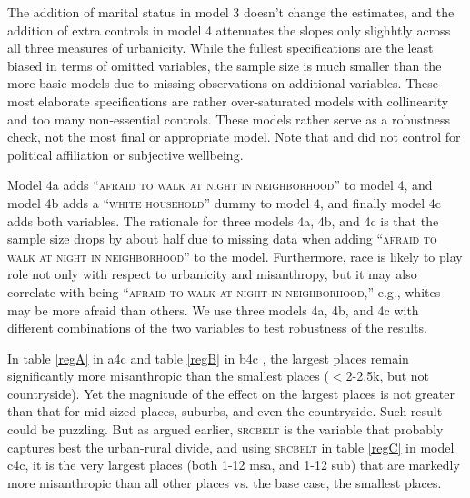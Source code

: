 \documentclass[11pt, letterpaper]{article}
\begin{document}
\begin{spacing}{1.4}
The addition of marital status in model 3 doesn't change the estimates, and the addition of extra controls in model 4 attenuates the slopes only slighhtly  across
all three measures of urbanicity.
{While the fullest specifications are the least biased in terms of omitted
variables, the sample size is much smaller than the more basic models due to
missing observations on additional variables. These most elaborate
specifications are rather over-saturated models with collinearity and 
too many non-essential controls. These models rather serve as a robustness check, not the most final or
appropriate model. %
 Note that \citet{smith97} and \citet{wilson85} did not control for political affiliation or subjective wellbeing.}


Model 4a adds ``\textsc{afraid to walk at night in neighborhood}'' to model 4,
and model 4b adds a ``\textsc{white household}'' dummy to model 4, and finally
model 4c adds both variables.  The rationale for three models 4a, 4b, and 4c is
that the sample size drops by about half due to missing data when adding ``\textsc{afraid to walk at
  night in neighborhood}'' to the model. Furthermore, race is
likely to play role not only with respect to urbanicity and misanthropy, but it
may also correlate with being ``\textsc{afraid to walk at night in
  neighborhood},'' e.g., whites may be more afraid than others. We use three
models 4a, 4b, and 4c with different combinations of the two variables to test
robustness of the results. 
%

In table \ref{regA} in a4c and table \ref{regB} in b4c%
, the largest places
remain significantly more misanthropic than the smallest places ($<$2-2.5k, but
not countryside). Yet the magnitude of the effect on the largest places is not
greater than that for mid-sized places, suburbs, and even the countryside. Such
result could be puzzling.
 But as argued earlier, \textsc{srcbelt} is the variable that probably captures
 best the urban-rural divide, and using \textsc{srcbelt} in table \ref{regC} in
 model c4c, it is the very largest places (both 1-12 msa, and 1-12 sub) that are markedly more misanthropic
 than all other places vs. the base case, the smallest places.


\end{spacing}
\end{document}

